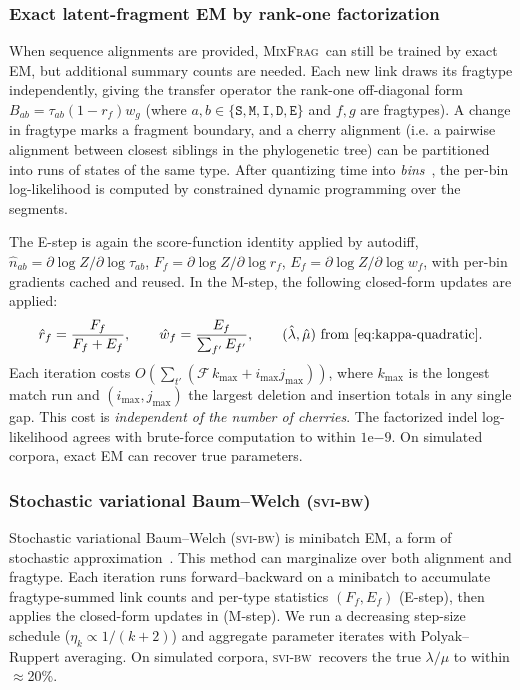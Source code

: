 \documentclass[11pt]{article}
\newcommand{\MixFrag}{\textsc{MixFrag}}
\newcommand{\ins}{\lambda}
\newcommand{\del}{\mu}
\newcommand{\svibw}{\textsc{svi-bw}}
\newcommand{\hst}[1]{\texttt{#1}}
\begin{document}
\subsubsection{Exact latent-fragment EM by rank-one factorization}
\label{sec:cherryem}

When sequence alignments are provided, \MixFrag\ can still be trained by 
exact EM, but additional summary counts are needed. 
Each new link draws its fragtype independently, giving the 
transfer operator the rank-one off-diagonal form $B_{ab}=\tau_{ab}(1-r_f)w_g$ (where $a,b \in \{ \hst{S}, \hst{M}, \hst{I}, \hst{D}, \hst{E} \}$ and $f,g$ are fragtypes). 
A change in fragtype marks a fragment boundary, and a cherry alignment (i.e. a pairwise alignment between closest siblings in the phylogenetic tree) can be
partitioned into runs of states of the same type. After quantizing time into \textit{bins}~\citep{Prillo2022CherryML}, the per-bin log-likelihood is
computed by constrained dynamic programming over the segments.

The E-step is again the score-function identity applied by
autodiff, $\hat n_{ab}=\partial\log Z/\partial\log\tau_{ab}$,
$F_f=\partial\log Z/\partial\log r_f$,
$E_f=\partial\log Z/\partial\log w_f$, with per-bin gradients cached and
reused. 
In the M-step, the following closed-form updates are applied:
\begin{equation}
\label{eq:mixfrag-mstep}
\hat r_f=\frac{F_f}{F_f+E_f},\qquad
\hat w_f=\frac{E_f}{\sum_{f'}E_{f'}},\qquad
(\hat\ins,\hat\del)\ \text{from \Cref{eq:kappa-quadratic}} .
\end{equation}
Each iteration costs $O(\sum_{t'}(\mathcal F\,k_{\max}+i_{\max}j_{\max}))$, where $k_{\max}$ is 
the longest match run and $(i_{\max},j_{\max})$ the largest deletion and insertion totals in any 
single gap. This cost is \emph{independent of the number of cherries}. The factorized indel 
log-likelihood agrees with brute-force computation to within $1\mathrm{e}{-9}$. On simulated 
corpora, exact EM can recover true parameters.

\subsubsection{Stochastic variational Baum--Welch (\svibw)}
\label{sec:svibw}
Stochastic variational Baum--Welch (\svibw) is minibatch EM, a form of stochastic 
approximation~\citep{cappemoulines2009}. This method can marginalize over both 
alignment and fragtype. Each iteration runs forward--backward on a minibatch to 
accumulate fragtype-summed link counts and per-type statistics $(F_f,E_f)$ (E-step), 
then applies the closed-form updates in  (M-step). We run a decreasing step-size schedule ($\eta_k\propto 1/(k{+}2)$) and aggregate parameter iterates with Polyak--Ruppert averaging.
On simulated corpora, \svibw\ recovers the true $\ins/\del$ to within $\approx$20\%.
\end{document}

